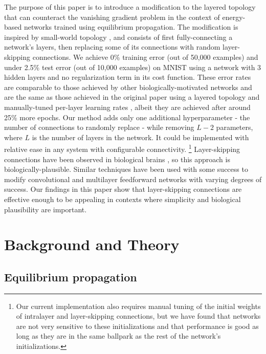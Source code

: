\documentclass[format=sigconf]{acmart}
\begin{document}
The purpose of this paper is to introduce a modification to the layered topology that can counteract the vanishing gradient problem in the context of energy-based networks trained using equilibrium propagation. The modification is inspired by small-world topology \cite{watts98}, and consists of first fully-connecting a network's layers, then replacing some of its connections with random layer-skipping connections. We achieve 0\% training error (out of 50,000 examples) and under 2.5\% test error (out of 10,000 examples) on MNIST using a network with 3 hidden layers and no regularization term in its cost function. These error rates are comparable to those achieved by other biologically-motivated networks \cite{bartunov2018} and are the same as those achieved in the original paper using a layered topology and manually-tuned per-layer learning rates \cite{scellier17}, albeit they are achieved after around 25\% more epochs. Our method adds only one additional hyperparameter - the number of connections to randomly replace - while removing $L-2$ parameters, where $L$ is the number of layers in the network. It could be implemented with relative ease in any system with configurable connectivity.
\footnote{Our current implementation also requires manual tuning of the initial weights of intralayer and layer-skipping connections, but we have found that networks are not very sensitive to these initializations and that performance is good as long as they are in the same ballpark as the rest of the network's initializations.} Layer-skipping connections have been observed in biological brains \cite{bullmore2009}, so this approach is biologically-plausible. Similar techniques have been used with some success to modify convolutional \cite{he2015, srivastava2015} and multilayer feedforward \cite{xiaohu2011, krishnan2019} networks with varying degrees of success. Our findings in this paper show that layer-skipping connections are effective enough to be appealing in contexts where simplicity and biological plausibility are important.


\section{Background and Theory}

\subsection{Equilibrium propagation}
\label{sec:eqp_formulation}
\end{document}
